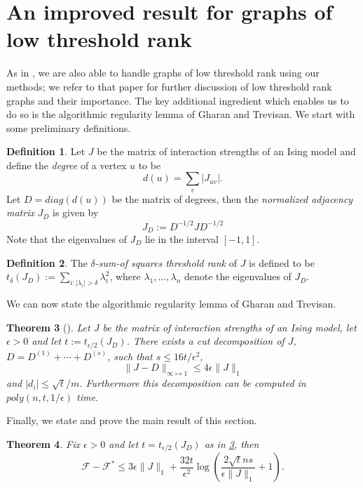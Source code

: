 \documentclass[final, 12pt]{colt2018}
\newcommand{\F}{\mathcal{F}}
\newcommand{\fnote}[1]{\textcolor{blue}{\small {\textbf{(Fred: }#1\textbf{) }}}}
\newtheorem{defn}[theorem]{Definition}
\newtheorem{theorem}{Theorem}[section]
\theoremstyle{definition}
\newtheorem{defn}[theorem]{Definition}
\theoremstyle{plain}
\begin{document}
\section{An improved result for graphs of low threshold rank}
As in \citep{risteski-ising}, we are also able to handle graphs of low threshold rank using our methods; we refer to that paper for further discussion of low threshold rank graphs and their importance. The key additional ingredient which enables us to do so is the algorithmic regularity lemma of Gharan and Trevisan. We start with some preliminary definitions.  
\begin{defn}
Let $J$ be the matrix of interaction strengths of an Ising
model and define the \emph{degree} of a vertex $u$ to be
\[ d(u) = \sum_{v} |J_{uv}|.\]
Let $D = diag(d(u))$ be the matrix of degrees, then
the \emph{normalized adjacency matrix} $J_{D}$ is given by
\[ J_{D} := D^{-1/2} J D^{-1/2} \]
Note that the eigenvalues of $J_{D}$ lie in the interval $[-1,1]$. 
\end{defn}
\begin{defn}
The \emph{$\delta$-sum-of squares threshold rank} of $J$ is defined to be $t_{\delta}(J_{D}):=\sum_{i:|\lambda_{i}|>\delta}\lambda_{i}^{2}$,
where $\lambda_{1},\dots,\lambda_{n}$ denote the eigenvalues of $J_{D}$. 
\end{defn}

We can now state the algorithmic regularity lemma of Gharan and Trevisan. 
\begin{theorem}[\citet{gharan-trevisan}]\label{reg-ghar-trev}
Let $J$ be the matrix of interaction strengths of an Ising
model, let
$\epsilon>0$ and let $t:=t_{\epsilon/2}(J_{D})$. There exists
a cut decomposition of $J$, $D = D^{(1)} + \cdots + D^{(s)}$, such that
$s \le 16 t/\epsilon^2$, 
\[ \|J - D\|_{\infty\mapsto 1} \le 4\epsilon \|J\|_1 \]
and $|d_i|\le \sqrt{t}/m$. Furthermore this decomposition can be computed
in $poly(n,t,1/\epsilon)$ time.
\end{theorem}

Finally, we state and prove the main result of this section.
\begin{theorem}
Fix $\epsilon > 0$ and let $t = t_{\epsilon/2}(J_D)$ as in \cref{reg-ghar-trev}, then
\[ \F - \mathcal{F}^* \le 3 \epsilon \|J\|_1 + \frac{32t}{\epsilon^2} \log\left(\frac{2 \sqrt{t} n s}{\epsilon \|J\|_1} + 1\right). \]
\end{theorem}
\end{document}
